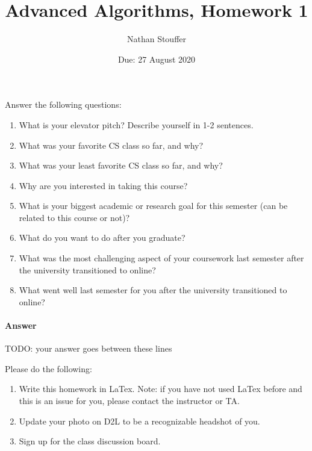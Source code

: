 \documentclass{article}
\title{Advanced Algorithms, Homework 1}
\author{Nathan Stouffer}
\date{Due: 27 August 2020}
\begin{document}
\maketitle



\nextprob
{}

Answer the following questions:
\begin{enumerate}
    \item What is your elevator pitch?  Describe yourself in 1-2
                sentences.
    \item What was your favorite CS class so far, and why?
    \item What was your least favorite CS class so far, and why?
    \item Why are you interested in taking this course?
    \item What is your biggest academic or research goal for this semester (can
        be related to this course or not)?
    \item What do you want to do after you graduate?
    \item What was the most challenging aspect of your coursework last semester
        after the university transitioned to online?
    \item What went well last semester for you after the university transitioned
        to online?
\end{enumerate}

\paragraph{Answer}


TODO: your answer goes between these lines


\nextprob
{}

Please do the following:
\begin{enumerate}
    \item Write this homework in LaTex.
        Note: if you have not used LaTex before and this is an
        issue for you, please contact the instructor or TA.
    \item Update your photo on D2L to be a recognizable headshot of you.
    \item Sign up for the class discussion board.
\end{enumerate}
\end{document}
